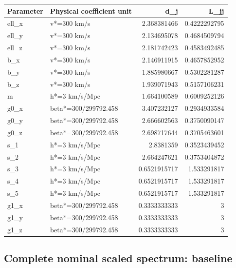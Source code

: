 \begin{longtable}[]{@{}llrr@{}}
\toprule\noalign{}
Parameter & Physical coefficient unit & d\_j & L\_jj \\
\midrule\noalign{}
\endhead
\bottomrule\noalign{}
\endlastfoot
ell\_x & v*=300 km/s & 2.368381466 & 0.4222292795 \\
ell\_y & v*=300 km/s & 2.134695078 & 0.4684509794 \\
ell\_z & v*=300 km/s & 2.181742423 & 0.4583492485 \\
b\_x & v*=300 km/s & 2.146911915 & 0.4657852952 \\
b\_y & v*=300 km/s & 1.885980667 & 0.5302281287 \\
b\_z & v*=300 km/s & 1.939071943 & 0.5157106231 \\
m & h*=3 km/s/Mpc & 1.664100589 & 0.6009252126 \\
g0\_x & beta*=300/299792.458 & 3.407232127 & 0.2934933584 \\
g0\_y & beta*=300/299792.458 & 2.666602563 & 0.3750090147 \\
g0\_z & beta*=300/299792.458 & 2.698717644 & 0.3705463601 \\
s\_1 & h*=3 km/s/Mpc & 2.8381359 & 0.3523439452 \\
s\_2 & h*=3 km/s/Mpc & 2.664247621 & 0.3753404872 \\
s\_3 & h*=3 km/s/Mpc & 0.6521915717 & 1.533291817 \\
s\_4 & h*=3 km/s/Mpc & 0.6521915717 & 1.533291817 \\
s\_5 & h*=3 km/s/Mpc & 0.6521915717 & 1.533291817 \\
g1\_x & beta*=300/299792.458 & 0.3333333333 & 3 \\
g1\_y & beta*=300/299792.458 & 0.3333333333 & 3 \\
g1\_z & beta*=300/299792.458 & 0.3333333333 & 3 \\
\end{longtable}

\hypertarget{complete-nominal-scaled-spectrum-baseline}{%
\subsection{Complete nominal scaled spectrum: baseline}\label{complete-nominal-scaled-spectrum-baseline}}

